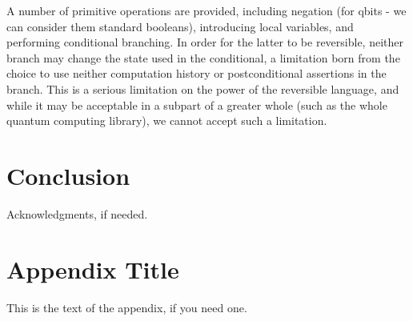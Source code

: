 \documentclass[10pt]{sigplanconf}
\begin{document}
A number of primitive operations are provided, including negation (for
qbits - we can consider them standard booleans), introducing local
variables, and performing conditional branching.  In order for the
latter to be reversible, neither branch may change the state used in
the conditional, a limitation born from the choice to use neither
computation history or postconditional assertions in the branch.  This
is a serious limitation on the power of the reversible language, and
while it may be acceptable in a subpart of a greater whole (such as
the whole quantum computing library), we cannot accept such a
limitation.

\section{Conclusion}




\acks
Acknowledgments, if needed.






\appendix
\section{Appendix Title}

This is the text of the appendix, if you need one.
\end{document}
